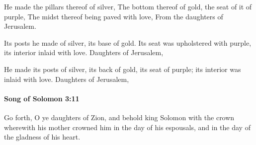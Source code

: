 			\begin{versebox}
					\item[BHS] 
					\item[LXX] 
					\item[ASV] He made the pillars thereof of silver, The bottom thereof of gold, the seat of it of purple, The midst thereof being paved with love, From the daughters of Jerusalem.
					\item[NIV] Its posts he made of silver, its base of gold. Its seat was upholstered with purple, its interior inlaid with love. Daughters of Jerusalem,
					\item[NRSV] He made its posts of silver, its back of gold, its seat of purple; its interior was inlaid with love. Daughters of Jerusalem,
			\end{versebox}

		\paragraph{Song of Solomon 3:11} %
			\label{SONGOFSOLOMON-3-11}

			Go forth, O ye daughters of Zion, and behold king Solomon with the crown wherewith his mother crowned him in the day of his espousals, and in the day of the gladness of his heart.

